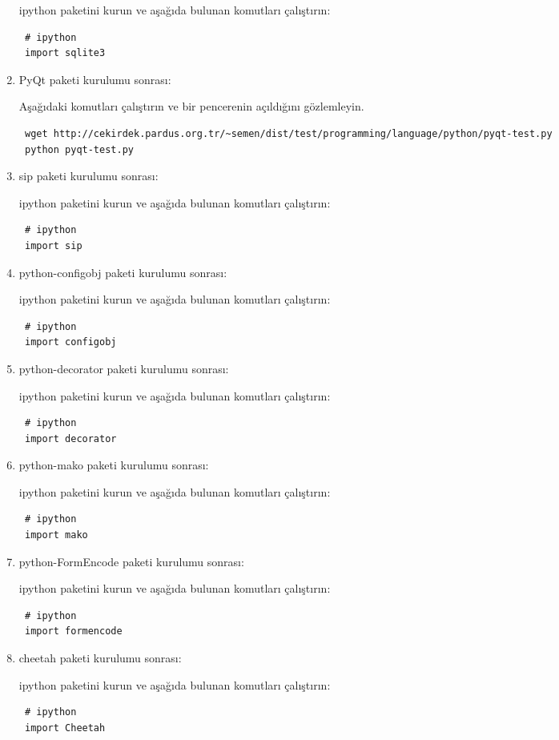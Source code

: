 \documentclass[a4paper,10pt]{article}
\begin{document}
\begin{enumerate}
ipython paketini kurun ve aşağıda bulunan komutları çalıştırın:
\begin{verbatim}
 # ipython
 import sqlite3
\end{verbatim}


\item PyQt paketi kurulumu sonrası:

Aşağıdaki komutları çalıştırın ve bir pencerenin açıldığını gözlemleyin.
\begin{verbatim}
 wget http://cekirdek.pardus.org.tr/~semen/dist/test/programming/language/python/pyqt-test.py
 python pyqt-test.py
\end{verbatim}


\item sip paketi kurulumu sonrası:

ipython paketini kurun ve aşağıda bulunan komutları çalıştırın:
\begin{verbatim}
 # ipython
 import sip
\end{verbatim}

\item python-configobj paketi kurulumu sonrası:

ipython paketini kurun ve aşağıda bulunan komutları çalıştırın:
\begin{verbatim}
 # ipython
 import configobj
\end{verbatim}
\item python-decorator paketi kurulumu sonrası:

ipython paketini kurun ve aşağıda bulunan komutları çalıştırın:
\begin{verbatim}
 # ipython
 import decorator
\end{verbatim}
\item python-mako paketi kurulumu sonrası:

ipython paketini kurun ve aşağıda bulunan komutları çalıştırın:
\begin{verbatim}
 # ipython
 import mako
\end{verbatim}

\item python-FormEncode paketi kurulumu sonrası:

ipython paketini kurun ve aşağıda bulunan komutları çalıştırın:
\begin{verbatim}
 # ipython
 import formencode
\end{verbatim}

\item cheetah  paketi kurulumu sonrası:

ipython paketini kurun ve aşağıda bulunan komutları çalıştırın:
\begin{verbatim}
 # ipython
 import Cheetah
\end{verbatim}



\end{enumerate}
\end{document}

